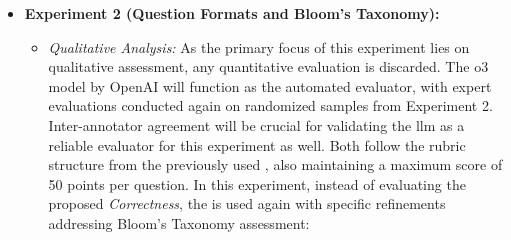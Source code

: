 \begin{itemize}
    \pagebreak

    \item \textbf{Experiment 2 (Question Formats and Bloom's Taxonomy):}
    \begin{itemize}
        \item \textit{Qualitative Analysis:} As the primary focus of this experiment lies on qualitative assessment, any quantitative evaluation is discarded. The o3 model by OpenAI will function as the automated evaluator, with expert evaluations conducted again on randomized samples from Experiment 2. Inter-annotator agreement will be crucial for validating the \ac{llm} as a reliable evaluator for this experiment as well. Both follow the rubric structure from the previously used \cite{mi_comparative_2024}, also maintaining a maximum score of 50 points per question. In this experiment, instead of evaluating the proposed \textit{Correctness}, the  is used again with specific refinements addressing Bloom's Taxonomy assessment:


\end{itemize}
\end{itemize}

